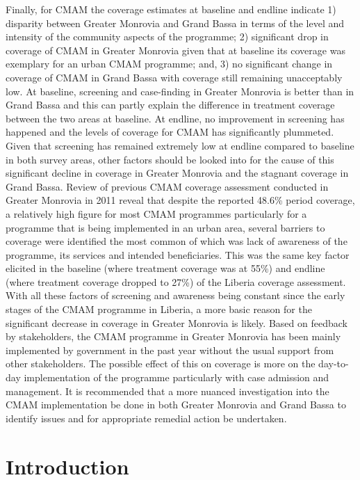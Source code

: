 \documentclass[12pt,a4paper]{article}
\begin{document}
Finally, for CMAM the coverage estimates at baseline and endline indicate 1) disparity between Greater Monrovia and Grand Bassa in terms of the level and intensity of the community aspects of the programme; 2) significant drop in coverage of CMAM in Greater Monrovia given that at baseline its coverage was exemplary for an urban CMAM programme; and, 3) no significant change in coverage of CMAM in Grand Bassa with coverage still remaining unacceptably low. At baseline, screening and case-finding in Greater Monrovia is better than in Grand Bassa and this can partly explain the difference in treatment coverage between the two areas at baseline. At endline, no improvement in screening has happened and the levels of coverage for CMAM has significantly plummeted. Given that screening has remained extremely low at endline compared to baseline in both survey areas, other factors should be looked into for the cause of this significant decline in coverage in Greater Monrovia and the stagnant coverage in Grand Bassa. Review of previous CMAM coverage assessment conducted in Greater Monrovia in 2011 reveal that despite the reported 48.6\% period coverage, a relatively high figure for most CMAM programmes particularly for a programme that is being implemented in an urban area, several barriers to coverage were identified the most common of which was lack of awareness of the programme, its services and intended beneficiaries. This was the same key factor elicited in the baseline (where treatment coverage was at 55\%) and endline (where treatment coverage dropped to 27\%) of the Liberia coverage assessment. With all these factors of screening and awareness being constant since the early stages of the CMAM programme in Liberia, a more basic reason for the significant decrease in coverage in Greater Monrovia is likely. Based on feedback by stakeholders, the CMAM programme in Greater Monrovia has been mainly implemented by government in the past year without the usual support from other stakeholders. The possible effect of this on coverage is more on the day-to-day implementation of the programme particularly with case admission and management. It is recommended that a more nuanced investigation into the CMAM implementation be done in both Greater Monrovia and Grand Bassa to identify issues and for appropriate remedial action be undertaken.

\newpage

\hypertarget{intro}{%
\section{Introduction}\label{intro}}
\end{document}
